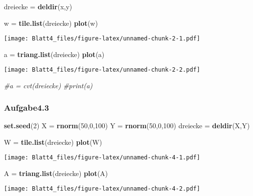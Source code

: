 \documentclass[
]{article}
\newenvironment{Shaded}{\begin{snugshade}}{\end{snugshade}}
\newcommand{\CommentTok}[1]{\textcolor[rgb]{0.56,0.35,0.01}{\textit{#1}}}
\newcommand{\DecValTok}[1]{\textcolor[rgb]{0.00,0.00,0.81}{#1}}
\newcommand{\KeywordTok}[1]{\textcolor[rgb]{0.13,0.29,0.53}{\textbf{#1}}}
\newcommand{\NormalTok}[1]{#1}
\newcommand{\StringTok}[1]{\textcolor[rgb]{0.31,0.60,0.02}{#1}}
\begin{document}
\begin{Shaded}
\begin{Highlighting}[]
\NormalTok{dreiecke =}\StringTok{ }\KeywordTok{deldir}\NormalTok{(x,y)}

\NormalTok{w =}\StringTok{ }\KeywordTok{tile.list}\NormalTok{(dreiecke)}
\KeywordTok{plot}\NormalTok{(w)}
\end{Highlighting}
\end{Shaded}

\texttt{[image: Blatt4\_files/figure-latex/unnamed-chunk-2-1.pdf]}

\begin{Shaded}
\begin{Highlighting}[]
\NormalTok{a =}\StringTok{ }\KeywordTok{triang.list}\NormalTok{(dreiecke)}
\KeywordTok{plot}\NormalTok{(a)}
\end{Highlighting}
\end{Shaded}

\texttt{[image: Blatt4\_files/figure-latex/unnamed-chunk-2-2.pdf]}

\begin{Shaded}
\begin{Highlighting}[]
\CommentTok{\#a = cvt(dreiecke)}
\CommentTok{\#print(a)}
\end{Highlighting}
\end{Shaded}

\hypertarget{aufgabe4.3}{%
\subsubsection{Aufgabe4.3}\label{aufgabe4.3}}

\begin{Shaded}
\begin{Highlighting}[]
\KeywordTok{set.seed}\NormalTok{(}\DecValTok{2}\NormalTok{)}
\NormalTok{X =}\StringTok{ }\KeywordTok{rnorm}\NormalTok{(}\DecValTok{50}\NormalTok{,}\DecValTok{0}\NormalTok{,}\DecValTok{100}\NormalTok{)}
\NormalTok{Y =}\StringTok{ }\KeywordTok{rnorm}\NormalTok{(}\DecValTok{50}\NormalTok{,}\DecValTok{0}\NormalTok{,}\DecValTok{100}\NormalTok{)}
\NormalTok{dreiecke =}\StringTok{ }\KeywordTok{deldir}\NormalTok{(X,Y)}

\NormalTok{W =}\StringTok{ }\KeywordTok{tile.list}\NormalTok{(dreiecke)}
\KeywordTok{plot}\NormalTok{(W)}
\end{Highlighting}
\end{Shaded}

\texttt{[image: Blatt4\_files/figure-latex/unnamed-chunk-4-1.pdf]}

\begin{Shaded}
\begin{Highlighting}[]
\NormalTok{A =}\StringTok{ }\KeywordTok{triang.list}\NormalTok{(dreiecke)}
\KeywordTok{plot}\NormalTok{(A)}
\end{Highlighting}
\end{Shaded}

\texttt{[image: Blatt4\_files/figure-latex/unnamed-chunk-4-2.pdf]}
\end{document}
